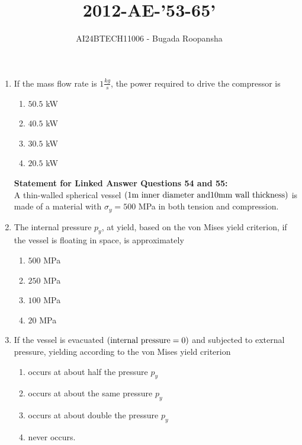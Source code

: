 \documentclass[journal,12pt,twocolumn]{IEEEtran}
\theoremstyle{remark}
\begin{document}

\vspace{3cm}
\title{2012-AE-'53-65'}
\author{AI24BTECH11006 - Bugada Roopansha}
\maketitle

\begin{enumerate}[start=53]
 
    \item If the mass flow rate is $1 \frac{kg}{s}$, the power required to drive the compressor is
    \begin{enumerate}
        \item $50.5$ kW
        \item $40.5$ kW
        \item $30.5$ kW
        \item $20.5$ kW
    \end{enumerate}

    \textbf{Statement for Linked Answer Questions 54 and 55:} \\
    A thin-walled spherical vessel $\left(1 \text{m inner diameter and} 10 \text{mm wall thickness}\right)$ is made of a material with $\sigma_y = 500$ MPa in both tension and compression.

    \item The internal pressure $p_y$, at yield, based on the von Mises yield criterion, if the vessel is floating in space, is approximately
    \begin{enumerate}
        \item $500$ MPa
        \item $250$ MPa
        \item $100$ MPa
        \item $20$ MPa
    \end{enumerate}

    \item If the vessel is evacuated $\left(\text{internal pressure} =0\right)$ and subjected to external pressure, yielding according to the von Mises yield criterion 
    \begin{enumerate}
        \item occurs at about half the pressure $p_y$
        \item occurs at about the same pressure $p_y$
        \item occurs at about double the pressure $p_y$
        \item never occurs.
    \end{enumerate}


\end{enumerate}
\end{document}
